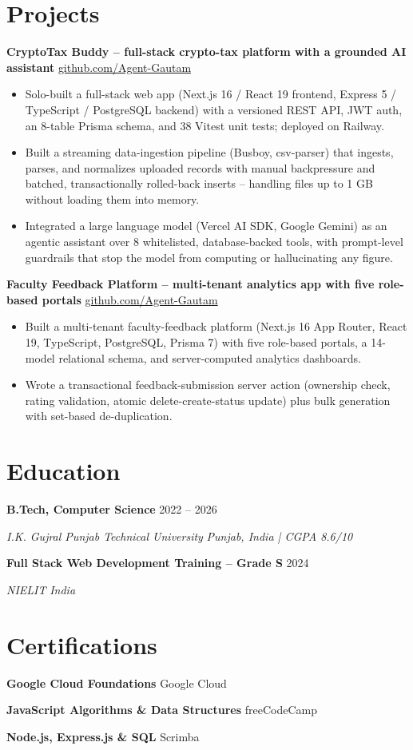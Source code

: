 \documentclass[letterpaper,10.5pt]{article}
\newcommand{\Entry}[4]{%
  \textbf{#1} \hfill {\small #2}\par
  \textit{\small #3} \hfill {\small\textit{#4}}\par\vspace{-1pt}}
\newcommand{\EntryLine}[2]{\textbf{#1} \hfill {\small #2}\par\vspace{-1pt}}
\newenvironment{Bullets}
  {\begin{itemize}[leftmargin=1.15em,itemsep=1pt,parsep=0pt,topsep=2pt]\small}
  {\end{itemize}\vspace{2pt}}
\begin{document}
\section{Projects}
\EntryLine{CryptoTax Buddy -- full-stack crypto-tax platform with a grounded AI assistant}{\href{https://github.com/Agent-Gautam}{github.com/Agent-Gautam}}
\begin{Bullets}
  \item Solo-built a full-stack web app (Next.js 16 / React 19 frontend, Express 5 / TypeScript / PostgreSQL backend) with a versioned REST API, JWT auth, an 8-table Prisma schema, and 38 Vitest unit tests; deployed on Railway.
  \item Built a streaming data-ingestion pipeline (Busboy, csv-parser) that ingests, parses, and normalizes uploaded records with manual backpressure and batched, transactionally rolled-back inserts -- handling files up to 1 GB without loading them into memory.
  \item Integrated a large language model (Vercel AI SDK, Google Gemini) as an agentic assistant over 8 whitelisted, database-backed tools, with prompt-level guardrails that stop the model from computing or hallucinating any figure.
\end{Bullets}

\EntryLine{Faculty Feedback Platform -- multi-tenant analytics app with five role-based portals}{\href{https://github.com/Agent-Gautam}{github.com/Agent-Gautam}}
\begin{Bullets}
  \item Built a multi-tenant faculty-feedback platform (Next.js 16 App Router, React 19, TypeScript, PostgreSQL, Prisma 7) with five role-based portals, a 14-model relational schema, and server-computed analytics dashboards.
  \item Wrote a transactional feedback-submission server action (ownership check, rating validation, atomic delete-create-status update) plus bulk generation with set-based de-duplication.
\end{Bullets}

\section{Education}
\Entry{B.Tech, Computer Science}{2022 -- 2026}{I.K. Gujral Punjab Technical University}{Punjab, India \;|\; CGPA 8.6/10}
\vspace{2pt}
\Entry{Full Stack Web Development Training -- Grade S}{2024}{NIELIT}{India}

\section{Certifications}
\EntryLine{Google Cloud Foundations}{Google Cloud}
\EntryLine{JavaScript Algorithms \& Data Structures}{freeCodeCamp}
\EntryLine{Node.js, Express.js \& SQL}{Scrimba}
\end{document}
